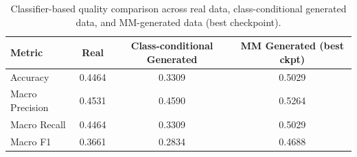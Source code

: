 \begin{table}[t]
\centering
\caption{Classifier-based quality comparison across real data, class-conditional generated data, and MM-generated data (best checkpoint).}
\begin{tabular}{lccc}
\toprule
Metric & Real & Class-conditional Generated & MM Generated (best ckpt) \\
\midrule
Accuracy & 0.4464 & 0.3309 & 0.5029 \\
Macro Precision & 0.4531 & 0.4590 & 0.5264 \\
Macro Recall & 0.4464 & 0.3309 & 0.5029 \\
Macro F1 & 0.3661 & 0.2834 & 0.4688 \\
\bottomrule
\end{tabular}
\label{tab:real_ccgen_mm_best}
\end{table}
